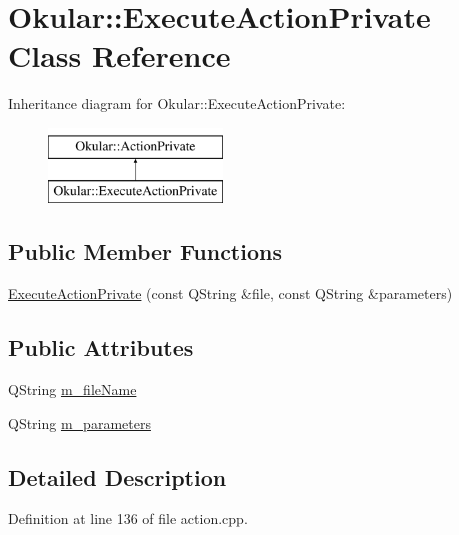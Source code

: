 \hypertarget{classOkular_1_1ExecuteActionPrivate}{\section{Okular\+:\+:Execute\+Action\+Private Class Reference}
\label{classOkular_1_1ExecuteActionPrivate}
}
Inheritance diagram for Okular\+:\+:Execute\+Action\+Private\+:\begin{figure}[H]
\begin{center}
\leavevmode
\includegraphics[height=2.000000cm]{classOkular_1_1ExecuteActionPrivate}
\end{center}
\end{figure}
\subsection*{Public Member Functions}
\begin{DoxyCompactItemize}
\item 
\hyperlink{classOkular_1_1ExecuteActionPrivate_af09f5eb69026af9dbec519759644a984}{Execute\+Action\+Private} (const Q\+String \&file, const Q\+String \&parameters)
\end{DoxyCompactItemize}
\subsection*{Public Attributes}
\begin{DoxyCompactItemize}
\item 
Q\+String \hyperlink{classOkular_1_1ExecuteActionPrivate_a58de7808bb86e89de4768ef2775dc834}{m\+\_\+file\+Name}
\item 
Q\+String \hyperlink{classOkular_1_1ExecuteActionPrivate_a8916a57c92ce0ff318b2d8a5edcd96a4}{m\+\_\+parameters}
\end{DoxyCompactItemize}


\subsection{Detailed Description}


Definition at line 136 of file action.\+cpp.



